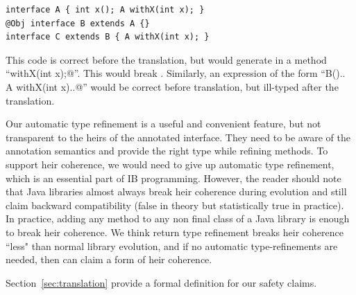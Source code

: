 \begin{lstlisting}
interface A { int x(); A withX(int x); }
@Obj interface B extends A {}
interface C extends B { A withX(int x); }
\end{lstlisting}

\noindent This code is correct before the translation, but \mixin would  generate in \Q@B@  a method ``\Q@B withX(int x);@''.
This would break \Q@C@.
Similarly, an expression of the form ``\Q@new B(){.. A withX(int x){..}}@''
would be correct before translation, but ill-typed after the translation.

Our automatic type refinement is a useful and convenient feature, but
not transparent to the heirs of the annotated interface.  They need to
be aware of the annotation semantics and provide the right type while
refining methods. To support heir coherence, we would need
to give up automatic type refinement, which is an essential part of IB programming.
However, the reader should note that Java libraries almost always break heir
coherence during evolution and still claim backward compatibility (false in
theory but statistically true in practice). In practice, adding any method to any
non final class of a Java library is enough to break heir
coherence.  We think return type refinement breaks heir coherence ``less" than normal library evolution, and
if no automatic type-refinements are needed, then \mixin can claim a
form of heir coherence.

Section~\ref{sec:translation} provide a formal definition for our
safety claims.

